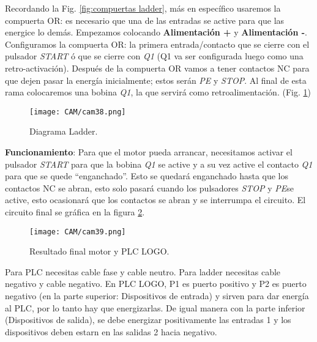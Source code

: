 \documentclass[
	12pt, %
	fleqn, %
	a4paper, %
	oneside, %
]{LegrandOrangeBook}
\begin{document}
Recordando la Fig. \ref{fig:compuertas ladder}, más en específico usaremos la compuerta OR: es necesario que una de las entradas se active para que las energice lo demás. Empezamos colocando \textbf{Alimentación +} y \textbf{Alimentación -}. 
Configuramos la compuerta OR: la primera entrada/contacto que se cierre con el pulsador \textit{START} ó que se cierre con \textit{Q1} (Q1 va ser configurada luego como una retro-activación). Después de la compuerta OR vamos a tener contactos NC para que dejen pasar la energía inicialmente; estos serán \textit{PE} y \textit{STOP}. Al final de esta rama colocaremos una bobina \textit{Q1}, la que servirá como retroalimentación. (Fig. \ref{fig:ladder motor})
\begin{figure}[]
\centering
\texttt{[image: CAM/cam38.png]}
\caption{Diagrama Ladder.}
\label{fig:ladder motor}
\end{figure}
\textbf{Funcionamiento}: Para que el motor pueda arrancar, necesitamos activar el pulsador \textit{START} para que la bobina \textit{Q1} se active y a su vez active el contacto \textit{Q1} para que se quede ``enganchado''. Esto se quedará enganchado hasta que los contactos NC se abran, esto solo pasará cuando los pulsadores \textit{STOP} y \textit{PE}se active, esto ocasionará que los contactos se abran y se interrumpa el circuito. El circuito final se gráfica en la figura \ref{fig:motor y logo}.
\begin{figure}[]
\centering
\texttt{[image: CAM/cam39.png]}
\caption{Resultado final motor y PLC LOGO.}
\label{fig:motor y logo}
\end{figure}
\begin{remark}
Para PLC necesitas cable fase y cable neutro. Para ladder necesitas cable negativo y cable negativo. En PLC LOGO, P1 es puerto positivo y P2 es puerto negativo (en la parte superior: Dispositivos de entrada) y sirven para dar energía al PLC, por lo tanto hay que energizarlas. De igual manera con la parte inferior (Dispositivos de salida), se debe energizar positivamente las entradas 1 y los dispositivos deben estarn en las salidas 2 hacia negativo.
\end{remark}
\end{document}
